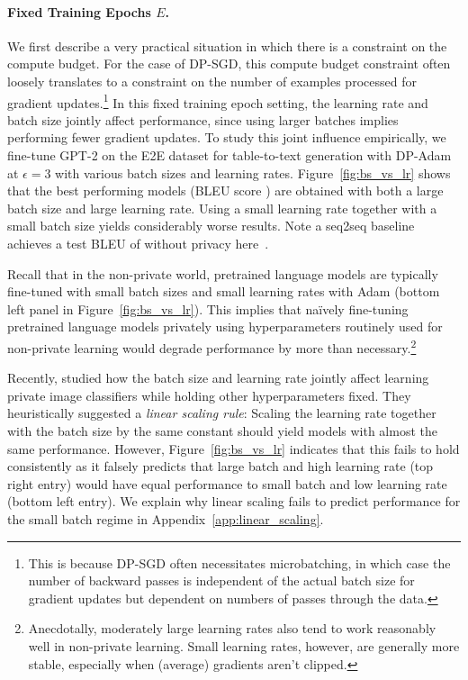 \paragraph{Fixed Training Epochs $E$.}
We first describe a very practical situation in which there is a constraint on the compute budget.
For the case of DP-SGD, this compute budget constraint often loosely translates to a constraint on the number of examples processed for gradient updates.\footnote{This is because DP-SGD often necessitates microbatching, in which case the number of backward passes is independent of the actual batch size for gradient updates but dependent on numbers of passes through the data.} 
In this fixed training epoch setting, the learning rate and batch size jointly affect performance, since using larger batches implies performing fewer gradient updates. 
To study this joint influence empirically, we fine-tune GPT-2 on the E2E dataset for table-to-text generation with DP-Adam at $\epsilon=3$ with various batch sizes and learning rates. 
Figure~\ref{fig:bs_vs_lr} shows that the best performing models (BLEU score )
are obtained with both a large batch size and large learning rate. 
Using a small learning rate together with a small batch size yields considerably worse results. 
Note a seq2seq baseline achieves a test 
BLEU of  without privacy here~\citep{wiseman2018learning}. 

Recall that in the non-private world, pretrained language models are typically fine-tuned with small batch sizes and small learning rates with Adam (bottom left panel in Figure~\ref{fig:bs_vs_lr}).
This implies that na\"ively fine-tuning pretrained language models privately using hyperparameters routinely used for non-private learning would degrade performance by more than necessary.\footnote{Anecdotally, moderately large learning rates also tend to work reasonably well in non-private learning. Small learning rates, however, are generally more stable, especially when (average) gradients aren't clipped.}

Recently, \cite{tramer2020differentially} studied how the batch size and learning rate jointly affect learning private image classifiers while holding other hyperparameters fixed.
They heuristically suggested a \textit{linear scaling rule}: Scaling the learning rate together with the batch size by the same constant should yield models with almost the same performance. 
However, Figure~\ref{fig:bs_vs_lr} indicates that this fails to hold consistently as it falsely predicts that large batch and high learning rate (top right entry) would have equal performance to small batch and low learning rate (bottom left entry).
We explain why linear scaling fails to predict performance for the small batch regime in Appendix~\ref{app:linear_scaling}. 


